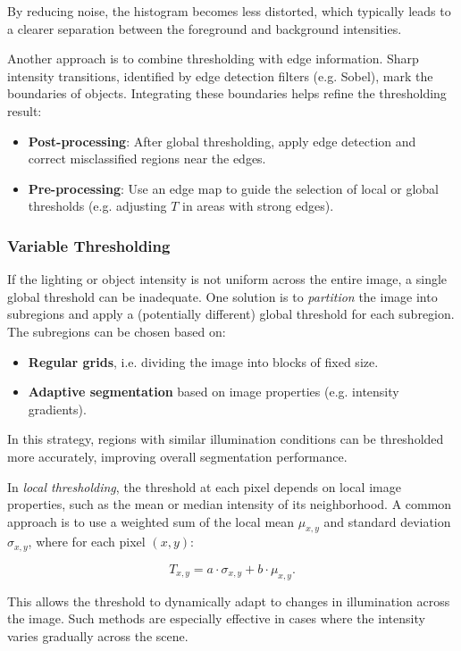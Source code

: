 \documentclass[a4paper,12pt]{article}
\begin{document}
By reducing noise, the histogram becomes less distorted, which typically leads to a clearer separation between the foreground and background intensities.

Another approach is to combine thresholding with edge information. Sharp intensity transitions, identified by edge detection filters (e.g. Sobel), mark the boundaries of objects. Integrating these boundaries helps refine the thresholding result:
\begin{itemize}
    \item \textbf{Post-processing}: After global thresholding, apply edge detection and correct misclassified regions near the edges.
    \item \textbf{Pre-processing}: Use an edge map to guide the selection of local or global thresholds (e.g. adjusting \(T\) in areas with strong edges).
\end{itemize}

\subsubsection{Variable Thresholding}

If the lighting or object intensity is not uniform across the entire image, a single global threshold can be inadequate. One solution is to \emph{partition} the image into subregions and apply a (potentially different) global threshold for each subregion. The subregions can be chosen based on:
\begin{itemize}
    \item \textbf{Regular grids}, i.e. dividing the image into blocks of fixed size.
    \item \textbf{Adaptive segmentation} based on image properties (e.g. intensity gradients).
\end{itemize}

In this strategy, regions with similar illumination conditions can be thresholded more accurately, improving overall segmentation performance.

In \emph{local thresholding}, the threshold at each pixel depends on local image properties, such as the mean or median intensity of its neighborhood. A common approach is to use a weighted sum of the local mean \(\mu_{x,y}\) and standard deviation \(\sigma_{x,y}\), where for each pixel \((x, y)\):

\[
T_{x,y} = a \cdot \sigma_{x,y} + b \cdot \mu_{x,y}.
\]

This allows the threshold to dynamically adapt to changes in illumination across the image. Such methods are especially effective in cases where the intensity varies gradually across the scene.
\end{document}
